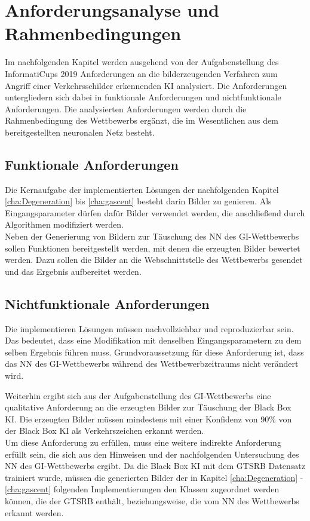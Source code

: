 \chapter{Anforderungsanalyse und Rahmenbedingungen}
\label{cha:AnfAnalyse}

Im nachfolgenden Kapitel werden ausgehend von der Aufgabenstellung des InformatiCups 2019 Anforderungen an die bilderzeugenden Verfahren zum Angriff einer Verkehrsschilder erkennenden \ac{KI} analysiert. Die Anforderungen untergliedern sich dabei in funktionale Anforderungen und nichtfunktionale Anforderungen. Die analysierten Anforderungen werden durch die Rahmenbedingung des Wettbewerbs ergänzt, die im Wesentlichen aus dem bereitgestellten neuronalen Netz besteht.

\section{Funktionale Anforderungen}
Die Kernaufgabe der implementierten Lösungen der nachfolgenden Kapitel \ref{cha:Degeneration} bis \ref{cha:gascent} besteht darin Bilder zu genieren. Als Eingangsparameter dürfen dafür Bilder verwendet werden, die anschließend durch Algorithmen modifiziert werden.\\
Neben der Generierung von Bildern zur Täuschung des \ac{NN} des \ac{GI}-Wettbewerbs sollen Funktionen bereitgestellt werden, mit denen die erzeugten Bilder bewertet werden. Dazu sollen die Bilder an die Webschnittstelle des Wettbewerbs gesendet und das Ergebnis aufbereitet werden.

\section{Nichtfunktionale Anforderungen}
Die implementieren Lösungen müssen nachvollziehbar und reproduzierbar sein. Das bedeutet, dass eine Modifikation mit denselben Eingangsparametern zu dem selben Ergebnis führen muss. Grundvoraussetzung für diese Anforderung ist, dass das \ac{NN} des \ac{GI}-Wettbewerbs während des Wettbewerbzeitraums nicht verändert wird.

Weiterhin ergibt sich aus der Aufgabenstellung des \ac{GI}-Wettbewerbs eine qualitative Anforderung an die erzeugten Bilder zur Täuschung der Black Box \ac{KI}. Die erzeugten Bilder müssen mindestens mit einer Konfidenz von 90\% von der Black Box \ac{KI} als Verkehrszeichen erkannt werden. \cite{gesellschaft_fur_informatik_e.v._informaticup2019-irrbilder.pdf_2018} \\
Um diese Anforderung zu erfüllen, muss eine weitere indirekte Anforderung erfüllt sein, die sich aus den Hinweisen und der nachfolgenden Untersuchung des \ac{NN} des \ac{GI}-Wettbewerbs ergibt. Da die Black Box \ac{KI} mit dem \ac{GTSRB} Datensatz trainiert wurde, müssen die generierten Bilder der in Kapitel \ref{cha:Degeneration} - \ref{cha:gascent} folgenden Implementierungen den Klassen zugeordnet werden können, die der \ac{GTSRB} enthält, beziehungsweise, die vom \ac{NN} des Wettbewerbs erkannt werden. 

